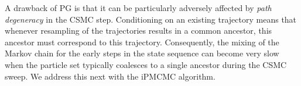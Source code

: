 A drawback of PG is that it can be particularly adversely affected by \emph{path degeneracy} in the CSMC step.  Conditioning on an existing trajectory means that whenever resampling of the trajectories results in a common ancestor, this ancestor must correspond to this trajectory.  Consequently, the mixing of the Markov chain for the early steps in the state sequence can become very slow when the particle set typically coalesces to a single ancestor during the CSMC sweep.
We address this next with the iPMCMC algorithm.



%
%

